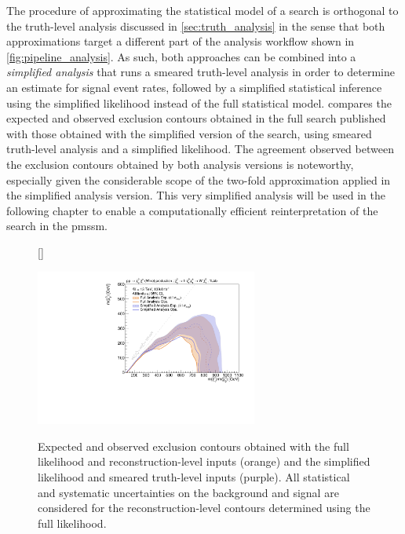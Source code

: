 The procedure of approximating the statistical model of a search is orthogonal to the truth-level analysis discussed in \cref{sec:truth_analysis} in the sense that both approximations target a different part of the analysis workflow shown in \cref{fig:pipeline_analysis}.
As such, both approaches can be combined into a \textit{simplified analysis} that runs a smeared truth-level analysis in order to determine an estimate for signal event rates, followed by a simplified statistical inference using the simplified likelihood instead of the full statistical model.
 compares the expected and observed exclusion contours obtained in the full \onelepton search published with those obtained with the simplified version of the search, using smeared truth-level analysis and a simplified likelihood.
The agreement observed between the exclusion contours obtained by both analysis versions is noteworthy, especially given the considerable scope of the two-fold approximation applied in the simplified analysis version.
This very simplified analysis will be used in the following chapter to enable a computationally efficient reinterpretation of the \onelepton search in the \gls{pmssm}.

\begin{figure}
[\FBwidth]
{\caption{Expected and observed exclusion contours obtained with the full likelihood and reconstruction-level inputs (orange) and the simplified likelihood and smeared truth-level inputs (purple). All statistical and systematic uncertainties on the background and signal are considered for the reconstruction-level contours determined using the full likelihood.}\label{fig:exclusion_1Lbb_truthInput_BkgSignal_700_200_noLabel}}
{\includegraphics[width=0.65\textwidth]{exclusion_1Lbb_truthInput_BkgSignal_700_200_noLabel}}
\end{figure}


